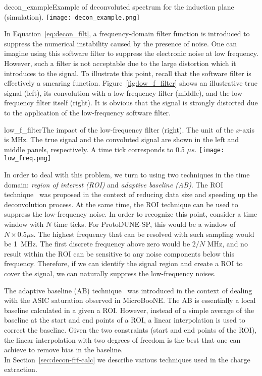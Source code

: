 \begin{cdrfigure}{decon_example}{Example of deconvoluted spectrum for the induction plane (simulation).}
\texttt{[image: decon\_example.png]}
\end{cdrfigure}


In Equation~\eqref{eq:decon_filt}, a frequency-domain  filter function is introduced 
to suppress the numerical instability caused by the presence of noise. One can imagine using %
this software filter to suppress the electronic noise at low frequency. 
However, such a filter is not acceptable due to the large distortion which it introduces to the signal.
To illustrate this point, recall that the software filter is effectively a smearing function. 
Figure~\ref{fig:low_f_filter} shows an illustrative true signal (left), its convolution 
with a low-frequency filter (middle), and the low-frequency filter itself (right). 
It is obvious that the signal is strongly distorted due to the application of the 
low-frequency software filter. 

\begin{cdrfigure}{low_f_filter}{The impact of the low-frequency filter (right). The unit of the $x$-axis 
is MHz.  The true signal and the convoluted signal are shown in the left and
middle panels, respectively. A time tick corresponds to 0.5 $\mu s$.}
\texttt{[image: low\_freq.png]}
\end{cdrfigure}

In order to deal with this problem, we turn to using two techniques in the time domain: 
\textit{region of interest (ROI)} and \textit{adaptive baseline (AB)}. The ROI technique~\cite{roi}
was proposed in the context of reducing data size and speeding up the 
deconvolution process. At the same time, the ROI technique can %
be used to 
suppress the low-frequency noise. In order to recognize this point, consider
a time window with $N$ time ticks.  For ProtoDUNE-SP, this would be a window of 
$N\times0.5\mu\mbox{s}$. The highest frequency that can be resolved with such 
sampling would be 1~MHz. The first discrete frequency above zero would be $2/N$ MHz, 
and no result within the ROI can be sensitive to any noise components below this 
frequency.  Therefore, if we can identify the signal region and create a ROI to 
cover the signal, we can naturally suppress the low-frequency noises. 

The adaptive baseline (AB) technique~\cite{ab} was introduced  
in the context of 
dealing with the ASIC saturation observed in MicroBooNE. The AB is essentially a 
local baseline calculated in a given a ROI. However, instead of a simple average of 
the baseline at the start and end points of a ROI, a linear interpolation is used to 
correct the baseline. Given the two constraints (start and end points of the ROI), 
the linear interpolation with two degrees of freedom is the best that one can achieve 
to remove bias in the baseline. \\
%
In Section~\ref{sec:decon-frf-calc} %
we describe various techniques 
used in the charge extraction.

